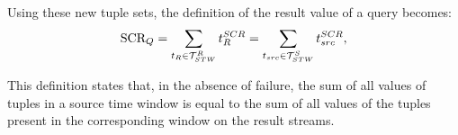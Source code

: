 Using these new tuple sets, the definition of the result \sic value of a query becomes:
\begin{align} 
		\textrm{SCR}_Q = \sum_{t_R \in \mathcal{T}^R_{STW}} t_{R}^{SCR} = \sum_{t_{src} \in \mathcal{T}^{S}_{STW}}
		t_{src}^{SCR},
\end{align}

This definition states that, in the absence of failure, the sum of all \sic values of tuples in a source
time window is equal to the sum of all \sic values of the tuples present in the corresponding window on
the result streams.
% 
% 
% 
